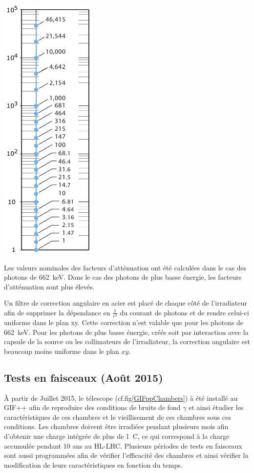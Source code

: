 \marginpar
{
	\centering
	\includegraphics[width=1.0\marginparwidth]{GLA/ValueAttenuateur.png}
	\label{ValueAttenuateur}
}

Les valeurs nominales des facteurs d'atténuation ont été calculées dans le cas des photons de \SI{662}{\kilo\eV}. Dans le cas des photons de plus basse énergie, les facteurs d'atténuation sont plus élevés. 

Un filtre de correction angulaire en acier est placé de chaque côté de l'irradiateur afin de supprimer la dépendance en $\frac{1}{r^2}$ du courant de photons et de rendre celui-ci uniforme dans le plan xy. Cette correction n'est valable que pour les photons de \SI{662}{\kilo\eV}. Pour les photons de plus basse énergie, créés soit par interaction avec la capsule de la source ou les collimateurs de l'irradiateur, la correction angulaire est beaucoup moins uniforme dans le plan $xy$.

\subsection{Tests en faisceaux (Août 2015)}
À partir de Juillet 2015, le télescope (cf.fig\ref{GIFppChambers}) à été installé au GIF++ afin de reproduire des conditions de bruits de fond $\gamma$ et ainsi étudier les caractéristiques de ces chambres et le vieillisement de ces chambres sous ces conditions. Les chambres doivent être irradiées pendant plusieurs mois afin d'obtenir une charge intégrée de plus de \SI{1}{\coulomb}, ce qui correspond à la charge accumulée pendant \num{10} ans au HL-LHC.
Plusieurs périodes de tests en faisceaux sont aussi programmées afin de vérifier l'efficacité des chambres et ainsi vérifier la modification de leurs caractéristiques en fonction du temps.

